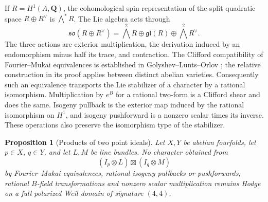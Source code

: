 \documentclass[11pt]{article}
\newtheorem{proposition}[theorem]{Proposition}
\theoremstyle{definition}
\theoremstyle{remark}
\newcommand{\Q}{\mathbf Q}
\begin{document}
If $R=H^1(A,\Q)$, the cohomological spin representation of the split quadratic space $R\oplus R^\vee$ is $\bigwedge^*R$. The Lie algebra acts through
\begin{equation}\label{eq:spin-lie-action}
 \mathfrak{so}(R\oplus R^\vee)
 =\bigwedge^2R\oplus\mathfrak{gl}(R)\oplus\bigwedge^2R^\vee.
\end{equation}
The three actions are exterior multiplication, the derivation induced by an endomorphism minus half its trace, and contraction. The Clifford compatibility of Fourier--Mukai equivalences is established in Golyshev--Lunts--Orlov \cite[\S3 and Proposition~4.3.7, author pp.~17--19]{GLO}; the relative construction in its proof applies between distinct abelian varieties. Consequently such an equivalence transports the Lie stabilizer of a character by a rational isomorphism. Multiplication by $e^B$ for a rational two-form is a Clifford shear and does the same. Isogeny pullback is the exterior map induced by the rational isomorphism on $H^1$, and isogeny pushforward is a nonzero scalar times its inverse. These operations also preserve the isomorphism type of the stabilizer.

\begin{proposition}[Products of two point ideals]\label{prop:point-product-spin}
Let $X,Y$ be abelian fourfolds, let $p\in X$, $q\in Y$, and let $L,M$ be line bundles. No character obtained from
\[
 (I_p\otimes L)\boxtimes(I_q\otimes M)
\]
by Fourier--Mukai equivalences, rational isogeny pullbacks or pushforwards, rational $B$-field transformations and nonzero scalar multiplication remains Hodge on a full polarized Weil domain of signature $(4,4)$.
\end{proposition}
\end{document}
